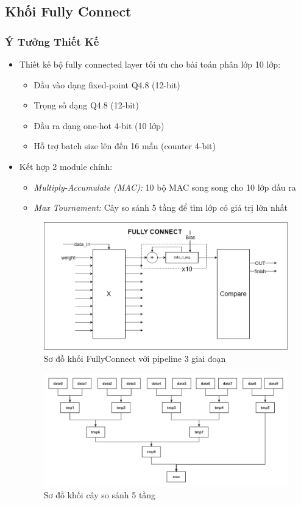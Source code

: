 \subsection{Khối Fully Connect}
\subsubsection{Ý Tưởng Thiết Kế}
\begin{itemize}
    \item Thiết kế bộ fully connected layer tối ưu cho bài toán phân lớp 10 lớp:
    \begin{itemize}
        \item Đầu vào dạng fixed-point Q4.8 (12-bit)
        \item Trọng số dạng Q4.8 (12-bit)
        \item Đầu ra dạng one-hot 4-bit (10 lớp)
        \item Hỗ trợ batch size lên đến 16 mẫu (counter 4-bit)
    \end{itemize}
    
    \item Kết hợp 2 module chính:
    \begin{itemize}
        \item \textit{Multiply-Accumulate (MAC):} 10 bộ MAC song song cho 10 lớp đầu ra
        \item \textit{Max Tournament:} Cây so sánh 5 tầng để tìm lớp có giá trị lớn nhất
    \end{itemize}
    \begin{figure}[H]
        \centering
        \includegraphics[width=0.8\linewidth]{Images/fc_arch.png}
        \caption{Sơ đồ khối FullyConnect với pipeline 3 giai đoạn}
        \label{fig:fc_arch}
    \end{figure}

    \begin{figure}[H]
        \centering
        \includegraphics[width=0.8\linewidth]{Images/comptree.png}
        \caption{Sơ đồ khối cây so sánh 5 tầng}
        \label{fig:enter-label}
    \end{figure}


\end{itemize}
